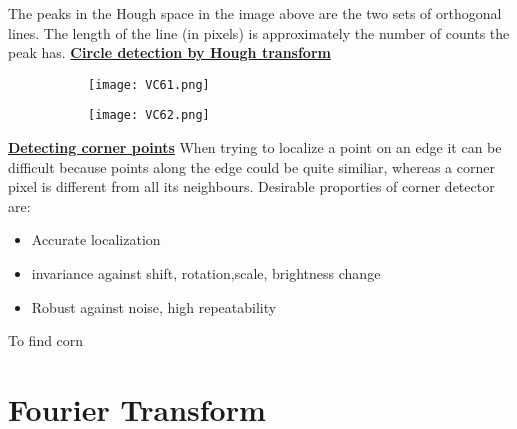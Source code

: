 \documentclass[8pt]{extreport}
\begin{document}
The peaks in the Hough space in the image above are the two sets of orthogonal lines. The length of the line (in pixels) is approximately the number of counts the peak has.
\underline{\textbf{Circle detection by Hough transform}}
 \begin{figure}[H]
\centering
\begin{subfigure}[b]{0.32\linewidth}
\texttt{[image: VC61.png]}
\end{subfigure}
\begin{subfigure}[b]{0.32\linewidth}
\texttt{[image: VC62.png]}
\end{subfigure}
\end{figure} 

\underline{\textbf{Detecting corner points}} When trying to localize a point on an edge it can be difficult because points along the edge could be quite similiar, whereas a corner pixel is different from all its neighbours. Desirable proporties of corner detector are:
\begin{itemize}
\item Accurate localization
\item invariance against shift, rotation,scale, brightness change
\item Robust against noise, high repeatability
\end{itemize}
To find corn








\chapter{Fourier Transform}




































 
\end{document}
